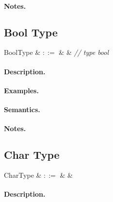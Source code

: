 \paragraph{Notes.} 


\subsection{Bool Type}

\begin{syntax}
  BoolType & $::=$ &  & {\em // type bool}\\
\end{syntax}

\paragraph{Description.}

\paragraph{Examples.}

\paragraph{Semantics.}

\paragraph{Notes.} 


\subsection{Char Type}

\begin{syntax}
  CharType & $::=$ &  & \\
\end{syntax}

\paragraph{Description.}

